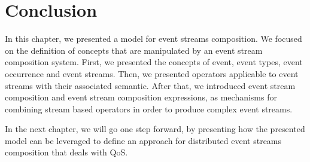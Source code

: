  \section{Conclusion}
In this chapter, we presented a model for event streams composition.
We focused on the definition of concepts that are manipulated by an event stream composition system.
First, we presented the concepts of event, event types, event occurrence and event streams.
Then, we presented operators applicable to event streams with their associated semantic. 
After that, we introduced event stream composition and event stream composition expressions, as mechanisms for combining stream based operators in order to produce complex event streams.

In the next chapter, we will go one step forward, by presenting how the presented model can be leveraged to define an approach for distributed event streams composition that deals with QoS.